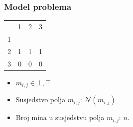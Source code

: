 \documentclass{beamer}
\begin{document}
    \begin{frame}[t]
        \frametitle{Model problema}

        \begin{table}[ht]
            \centering
            \begin{tabular}{llll}
                                   & 1                      & 2                      & 3                      \\ \cline{2-4}
            \multicolumn{1}{l|}{1} & \multicolumn{1}{l|}{}  & \multicolumn{1}{l|}{}  & \multicolumn{1}{l|}{}  \\ \cline{2-4}
            \multicolumn{1}{l|}{2} & \multicolumn{1}{l|}{1} & \multicolumn{1}{l|}{1} & \multicolumn{1}{l|}{1} \\ \cline{2-4}
            \multicolumn{1}{l|}{3} & \multicolumn{1}{l|}{0} & \multicolumn{1}{l|}{0} & \multicolumn{1}{l|}{0}  \\ \cline{2-4}
            \end{tabular}
        \end{table}

        \begin{itemize}
            \item<1-> $m_{i, j} \in {\bot, \top}$
            \item<2-> Susjedstvo polja $m_{i, j}$: $\mathcal{N}(m_{i, j})$
            \item<3-> Broj mina u susjedstvu polja $m_{i, j}$: $n$.
        \end{itemize}

    \end{frame}
\end{document}
